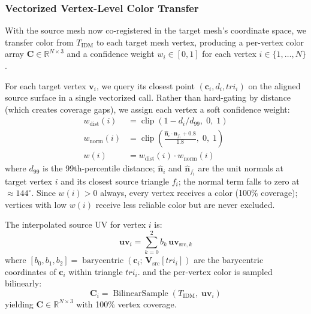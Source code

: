 \documentclass[conference]{IEEEtran}
\newcommand{\R}{\mathbb{R}}
\newcommand{\TIDM}{T_{\text{IDM}}}
\newcommand{\Vsrc}{\mathbf{V}_{\text{src}}}
\begin{document}
\subsubsection{Vectorized Vertex-Level Color Transfer}
\label{sec:color_transfer}

With the source mesh now co-registered in the target mesh's coordinate space,
we transfer color from $\TIDM$ to each target mesh vertex, producing a
per-vertex color array $\mathbf{C} \in \R^{N \times 3}$ and a confidence weight
$w_i \in [0,1]$ for each vertex $i \in \{1,\dots,N\}$.

For each target vertex $\mathbf{v}_i$, we query its closest point
$(\mathbf{c}_i, d_i, \mathit{tri}_i)$ on the aligned source surface in a
single vectorized call. Rather than hard-gating by distance (which creates
coverage gaps), we assign each vertex a soft confidence weight:
\begin{align}
  w_{\text{dist}}(i) &= \operatorname{clip}(1 - d_i/d_{99},\;0,\;1)
  \label{eq:w_dist} \\
  w_{\text{norm}}(i) &= \operatorname{clip}\!\left(
    \tfrac{\hat{\mathbf{n}}_i \cdot \hat{\mathbf{n}}_{f_i} + 0.8}{1.8},\;0,\;1\right)
  \label{eq:w_norm} \\
  w(i) &= w_{\text{dist}}(i)\cdot w_{\text{norm}}(i)
  \label{eq:w_combined}
\end{align}
where $d_{99}$ is the 99th-percentile distance; $\hat{\mathbf{n}}_i$ and
$\hat{\mathbf{n}}_{f_i}$ are the unit normals at target vertex $i$ and its
closest source triangle $f_i$; the normal term falls to zero at ${\approx}144^\circ$. Since $w(i)>0$ always, every vertex receives a
color (100\% coverage); vertices with low $w(i)$ receive less reliable color
but are never excluded.

The interpolated source UV for vertex $i$ is:
\begin{equation}
  \mathbf{uv}_i = \sum_{k=0}^{2} b_k\,\mathbf{uv}_{\text{src},k}
  \label{eq:bary_weights}
\end{equation}
where $[b_0,b_1,b_2] = \operatorname{barycentric}(\mathbf{c}_i;\,\Vsrc[\mathit{tri}_i])$
are the barycentric coordinates of $\mathbf{c}_i$ within triangle $\mathit{tri}_i$.
and the per-vertex color is sampled bilinearly:
\begin{equation}
  \mathbf{C}_i = \operatorname{BilinearSample}(\TIDM,\; \mathbf{uv}_i)
  \label{eq:bilinear}
\end{equation}
yielding $\mathbf{C} \in \R^{N \times 3}$ with 100\% vertex coverage.
\end{document}
